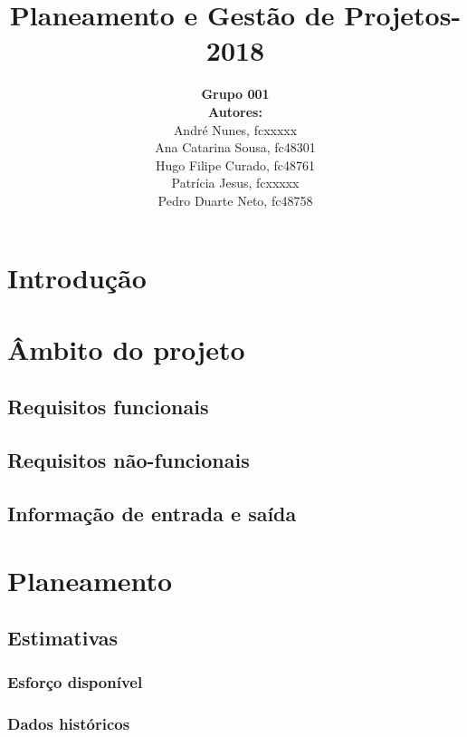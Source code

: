 \documentclass[a4paper]{report}
\begin{document}
\title{\textbf{Planeamento e Gestão de Projetos}\linebreak {}-2018\linebreak {}}
\date{}
\author{
	\textbf{Grupo 001}\\
	\textbf{Autores:}\\
	André Nunes, fcxxxxx\\
	Ana Catarina Sousa, fc48301\\ 
	Hugo Filipe Curado, fc48761\\ 
	Patrícia Jesus, fcxxxxx\\
	Pedro Duarte Neto, fc48758
}
\maketitle
\tableofcontents
\chapter{Introdução}
\chapter{Âmbito do projeto}
\section{Requisitos funcionais}
\section{Requisitos não-funcionais}
\section{Informação de entrada e saída}
\chapter{Planeamento}
\section{Estimativas}
\subsection{Esforço disponível}
\subsection{Dados históricos}
\end{document}
